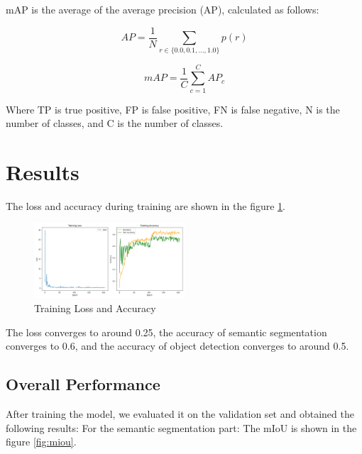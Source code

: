 \documentclass[conference]{IEEEtran}
\begin{document}
mAP is the average of the average precision (AP), calculated as follows:

\[AP = \frac{1}{N} \sum_{r \in \{0.0, 0.1, \ldots, 1.0\}} p(r)\]

\[mAP = \frac{1}{C} \sum_{c=1}^{C} AP_c\]


Where TP is true positive, FP is false positive, FN is false negative, N is the number of classes, and C is the number of classes.

\section{Results}


The loss and accuracy during training are shown in the figure \ref{fig:loss}.

\begin{figure}[htbp]
    \centerline{\includegraphics[width=0.5\textwidth]{matrials/training_results.png}}
    \caption{Training Loss and Accuracy}
    \label{fig:loss}
\end{figure}


The loss converges to around 0.25, the accuracy of semantic segmentation converges to 0.6, and the accuracy of object detection converges to around 0.5.



\subsection{Overall Performance}


After training the model, we evaluated it on the validation set and obtained the following results:
For the semantic segmentation part:
The mIoU is shown in the figure \ref{fig:miou}.
\end{document}
